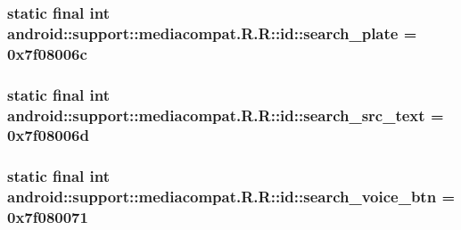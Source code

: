 \hypertarget{classandroid_1_1support_1_1mediacompat_1_1_r_1_1id_9fba303f1c9cc8c85016e07a809db7cc}{
\subsubsection[{search\_\-plate}]{\setlength{\rightskip}{0pt plus 5cm}static final int android::support::mediacompat.R.R::id::search\_\-plate = 0x7f08006c}}
\label{classandroid_1_1support_1_1mediacompat_1_1_r_1_1id_9fba303f1c9cc8c85016e07a809db7cc}


\hypertarget{classandroid_1_1support_1_1mediacompat_1_1_r_1_1id_540194c7c07b0d76ff29913b2b1cd8ce}{
\subsubsection[{search\_\-src\_\-text}]{\setlength{\rightskip}{0pt plus 5cm}static final int android::support::mediacompat.R.R::id::search\_\-src\_\-text = 0x7f08006d}}
\label{classandroid_1_1support_1_1mediacompat_1_1_r_1_1id_540194c7c07b0d76ff29913b2b1cd8ce}


\hypertarget{classandroid_1_1support_1_1mediacompat_1_1_r_1_1id_29303915bfffaf069b919815db792309}{
\subsubsection[{search\_\-voice\_\-btn}]{\setlength{\rightskip}{0pt plus 5cm}static final int android::support::mediacompat.R.R::id::search\_\-voice\_\-btn = 0x7f080071}}
\label{classandroid_1_1support_1_1mediacompat_1_1_r_1_1id_29303915bfffaf069b919815db792309}


